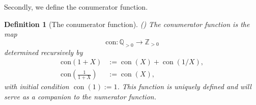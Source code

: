\documentclass[10pt,a4paper]{amsart}
\numberwithin{equation}{section}
\numberwithin{table}{section}
\numberwithin{figure}{section}
\DeclareMathOperator{\con}{con}
\newtheorem{definition}[thm]{Definition}
\begin{document}
Secondly, we define the conumerator function.\begin{definition}[The conumerator function]{\normalfont(\cite{ULUDAG2022103192})}	The \emph{conumerator function} is the map	\begin{equation*}		\mathrm{con}: \mathbb{Q}_{>0} \longrightarrow \mathbb{Z}_{>0}	\end{equation*}	determined recursively by	\begin{align}\label{con:1}	\mathrm{con}(1+X) &:= \con(X) + \con(1/X),\\		\mathrm{con}\!\left(\tfrac{1}{1+X}\right) &:= \con(X),\label{con:2}	\end{align}	with initial condition $\con(1) := 1$. 	This function is uniquely defined and will serve as a companion to the numerator function.\end{definition}
\end{document}
